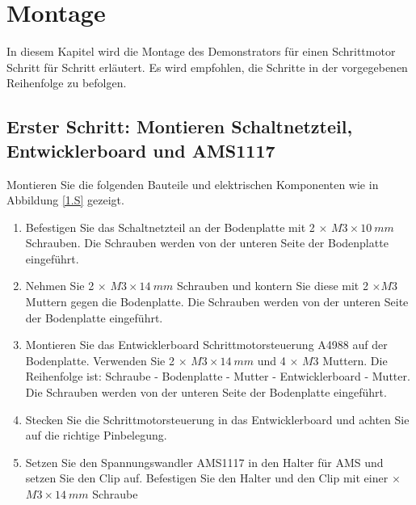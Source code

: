 %

\chapter{Montage}\label{Mont}

In diesem Kapitel wird die Montage des Demonstrators für einen Schrittmotor Schritt für Schritt erläutert. Es wird empfohlen, die Schritte in der vorgegebenen Reihenfolge zu befolgen.

\section{Erster Schritt: Montieren Schaltnetzteil, Entwicklerboard und AMS1117}
 Montieren Sie die folgenden Bauteile und elektrischen Komponenten wie in Abbildung \ref{1.S} gezeigt. 
 
\begin{enumerate}
 	\item Befestigen Sie das Schaltnetzteil an der Bodenplatte mit 2 $\times$ $ M3 \times 10 \ mm $ Schrauben. Die Schrauben werden von der unteren Seite der Bodenplatte eingeführt. 
 	\item Nehmen Sie 2 $\times$ $ M3 \times 14 \ mm $ Schrauben und kontern Sie diese mit 2 $\times M3 $ Muttern gegen die Bodenplatte. Die Schrauben werden von der unteren Seite der Bodenplatte eingeführt.
 	\item Montieren Sie das Entwicklerboard Schrittmotorsteuerung A4988 auf der Bodenplatte. Verwenden Sie 2 $\times$ $ M3 \times 14 \ mm $ und 4 $\times$ $ M3 $ Muttern. Die Reihenfolge ist: Schraube - Bodenplatte - Mutter - Entwicklerboard - Mutter. Die Schrauben werden von der unteren Seite der Bodenplatte eingeführt.
 	\item Stecken Sie die Schrittmotorsteuerung in das Entwicklerboard und achten Sie auf die richtige Pinbelegung.
 	\item Setzen Sie den Spannungswandler AMS1117 in den Halter für AMS und setzen Sie den Clip auf. Befestigen Sie den Halter und den Clip mit einer  $\times$ $ M3 \times 14 \ mm $ Schraube
\end{enumerate}
 

